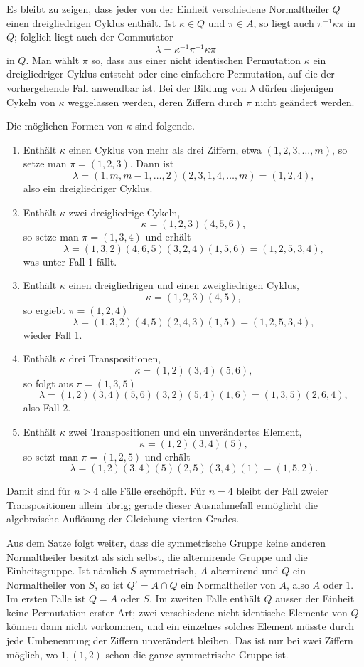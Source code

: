 \documentclass[11pt]{article}
\begin{document}
Es bleibt zu zeigen, dass jeder von der Einheit verschiedene Normaltheiler $Q$ einen dreigliedrigen Cyklus enthält. Ist $\kappa\in Q$ und $\pi\in A$, so liegt auch $\pi^{-1}\kappa\pi$ in $Q$; folglich liegt auch der Commutator
\[
  \lambda=\kappa^{-1}\pi^{-1}\kappa\pi                                      \tag{1}
\]
in $Q$. Man wählt $\pi$ so, dass aus einer nicht identischen Permutation $\kappa$ ein dreigliedriger Cyklus entsteht oder eine einfachere Permutation, auf die der vorhergehende Fall anwendbar ist. Bei der Bildung von $\lambda$ dürfen diejenigen Cykeln von $\kappa$ weggelassen werden, deren Ziffern durch $\pi$ nicht geändert werden.

Die möglichen Formen von $\kappa$ sind folgende.
\begin{enumerate}[label=\arabic*.]
\item Enthält $\kappa$ einen Cyklus von mehr als drei Ziffern, etwa $(1,2,3,\ldots,m)$, so setze man $\pi=(1,2,3)$. Dann ist
\[
\lambda=(1,m,m-1,\ldots,2)(2,3,1,4,\ldots,m)=(1,2,4),
\]
also ein dreigliedriger Cyklus.
\item Enthält $\kappa$ zwei dreigliedrige Cykeln,
\[
  \kappa=(1,2,3)(4,5,6),
\]
so setze man $\pi=(1,3,4)$ und erhält
\[
\lambda=(1,3,2)(4,6,5)(3,2,4)(1,5,6)=(1,2,5,3,4),
\]
was unter Fall 1 fällt.
\item Enthält $\kappa$ einen dreigliedrigen und einen zweigliedrigen Cyklus,
\[
  \kappa=(1,2,3)(4,5),
\]
so ergiebt $\pi=(1,2,4)$
\[
\lambda=(1,3,2)(4,5)(2,4,3)(1,5)=(1,2,5,3,4),
\]
wieder Fall 1.
\item Enthält $\kappa$ drei Transpositionen,
\[
  \kappa=(1,2)(3,4)(5,6),
\]
so folgt aus $\pi=(1,3,5)$
\[
\lambda=(1,2)(3,4)(5,6)(3,2)(5,4)(1,6)=(1,3,5)(2,6,4),
\]
also Fall 2.
\item Enthält $\kappa$ zwei Transpositionen und ein unverändertes Element,
\[
  \kappa=(1,2)(3,4)(5),
\]
so setzt man $\pi=(1,2,5)$ und erhält
\[
\lambda=(1,2)(3,4)(5)(2,5)(3,4)(1)=(1,5,2).
\]
\end{enumerate}
Damit sind für $n>4$ alle Fälle erschöpft. Für $n=4$ bleibt der Fall zweier Transpositionen allein übrig; gerade dieser Ausnahmefall ermöglicht die algebraische Auflösung der Gleichung vierten Grades.

Aus dem Satze folgt weiter, dass die symmetrische Gruppe keine anderen Normaltheiler besitzt als sich selbst, die alternirende Gruppe und die Einheitsgruppe. Ist nämlich $S$ symmetrisch, $A$ alternirend und $Q$ ein Normaltheiler von $S$, so ist $Q'=A\cap Q$ ein Normaltheiler von $A$, also $A$ oder $1$. Im ersten Falle ist $Q=A$ oder $S$. Im zweiten Falle enthält $Q$ ausser der Einheit keine Permutation erster Art; zwei verschiedene nicht identische Elemente von $Q$ können dann nicht vorkommen, und ein einzelnes solches Element müsste durch jede Umbenennung der Ziffern unverändert bleiben. Das ist nur bei zwei Ziffern möglich, wo $1,(1,2)$ schon die ganze symmetrische Gruppe ist.
\end{document}
